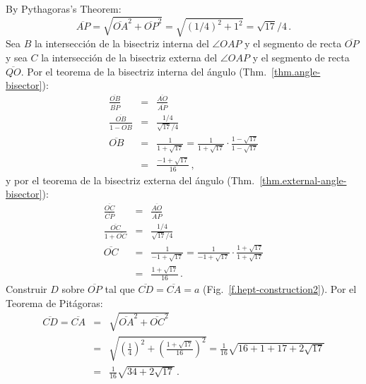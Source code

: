By Pythagoras's Theorem:
\[
\overline{AP}=\sqrt{\overline{OA}^2+\overline{OP}^2}=\sqrt{(1/4)^2+1^2}=\sqrt{17}/4\,.
\]
Sea $B$ la intersección de la bisectriz interna del $\angle OAP$ y el segmento de recta $\overline{OP}$ y sea $C$ la intersección de la bisectriz externa del $\angle OAP$ y el segmento de recta $\overline{QO}$. Por el teorema de la bisectriz interna del ángulo (Thm.~\ref{thm.angle-bisector}):
\begin{eqnarray*}
\frac{\overline{OB}}{\overline{BP}}&=&\frac{\overline{AO}}{\overline{AP}}\\
\frac{\overline{OB}}{1-\overline{OB}}&=&\frac{1/4}{\sqrt{17}/{4}}\\
\overline{OB}&=&\frac{1}{1+\sqrt{17}}=\frac{1}{1+\sqrt{17}}\cdot \frac{1-\sqrt{17}}{1-\sqrt{17}}\\
&=&\frac{-1+\sqrt{17}}{16}\,,
\end{eqnarray*}
y por el teorema de la bisectriz externa del ángulo (Thm.~\ref{thm.external-angle-bisector}):
\begin{eqnarray*}
\frac{\overline{OC}}{\overline{CP}}&=&\frac{\overline{AO}}{\overline{AP}}\\
\frac{\overline{OC}}{1+\overline{OC}}&=&\frac{1/4}{\sqrt{17}/{4}}\\
\overline{OC}&=&\frac{1}{-1+\sqrt{17}}=\frac{1}{-1+\sqrt{17}}\cdot \frac{1+\sqrt{17}}{1+\sqrt{17}}\\
&=&\frac{1+\sqrt{17}}{16}\,.
\end{eqnarray*}
Construir $D$ sobre $\overline{OP}$ tal que $\overline{CD}=\overline{CA}=a$ (Fig.~\ref{f.hept-construction2}). Por el Teorema de Pitágoras:
\begin{eqnarray*}
\overline{CD}=\overline{CA}&=&\sqrt{\overline{OA}^2+\overline{OC}^2}\\
&=&\sqrt{\left(\frac{1}{4}\right)^2+\left(\frac{1+\sqrt{17}}{16}\right)^2}=\frac{1}{16}\sqrt{16+1+17+2\sqrt{17}}\\
&=&\frac{1}{16}\sqrt{34+2\sqrt{17}}\,.
\end{eqnarray*}


